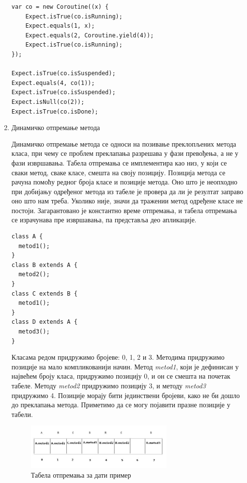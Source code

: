 \documentclass[12pt,oneside]{memoir}
\begin{document}
\begin{enumerate}
\begin{verbatim}
var co = new Coroutine((x) {
    Expect.isTrue(co.isRunning);
    Expect.equals(1, x);
    Expect.equals(2, Coroutine.yield(4));
    Expect.isTrue(co.isRunning);
});

Expect.isTrue(co.isSuspended);
Expect.equals(4, co(1));
Expect.isTrue(co.isSuspended);
Expect.isNull(co(2));
Expect.isTrue(co.isDone);
\end{verbatim}

\item Динамичко отпремање метода

Динамичко отпремање метода се односи на позивање преклопљених метода класа, при чему се проблем преклапања разрешава у фази превођења, а не у фази извршавања. Табела отпремања се имплементира као низ, у који се сваки метод, сваке класе, смешта на своју позицију. Позиција метода се рачуна помоћу редног броја класе и  позиције метода. Оно што је неопходно при добијању одређеног метода из табеле је провера да ли је резултат заправо оно што нам треба. Уколико није, значи да тражении метод одређене класе не постоји. Загарантовано је константно време отпремања, и табела отпремања се израчунава пре извршавања, па представља део апликације.

\begin{verbatim}
class A {
  metod1();
}
class B extends A {
  metod2();
}
class C extends B {
  metod1();
}
class D extends A {
  metod3();
}
\end{verbatim}

Класама редом придружимо бројеве: 0, 1, 2 и 3. Методима придружимо позиције на мало компликованији начин. Метод \textit{metod1}, који је дефинисан у највећем броју класа, придружимо позицију 0, и он се смешта на почетак табеле. Методу \textit{metod2} придружимо позицију 3, и методу \textit{metod3} придружимо 4. Позиције морају бити јединствени бројеви, како не би дошло до преклапања метода. Приметимо да се могу појавити празне позиције у табели.

\begin{figure}[!ht]
  \centering
  \includegraphics[width=0.7\textwidth]{otpremanje.jpg}
  \caption{Табела отпремања за дати пример}
  \label{fig:otpremanje}
\end{figure}


\end{enumerate}
\end{document}
